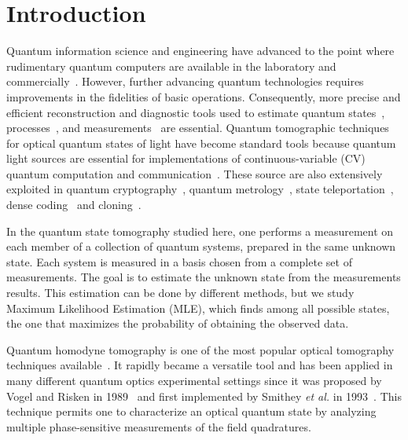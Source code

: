 \documentclass[
reprint,
superscriptaddress,
showpacs,
amsmath,
amssymb,
aps,
pra,
longbibliography
]{revtex4-1}
\begin{document}

\section{Introduction}
\label{intro}
Quantum information science and engineering have advanced to the point
where rudimentary quantum computers are available in the laboratory
and commercially~\cite{kandala2017, Linke2017, Monk2017, Denchev2016}.
However, further advancing quantum technologies requires improvements
in the fidelities of basic operations.  Consequently, more precise and
efficient reconstruction and diagnostic tools used to estimate quantum
states~\cite{Vogel1989, Smithey1993, Dunn1995, Banaszek1999,
  Banaszek2000, White2002, Ourjoumtsev2007, Neergaard2006},
processes~\cite{Chuang1997, Poyatos1997, Altepeter2003, Dariano1998,
  Nielsen1998, Mitchell2003, Obrien2004,Kupchak2015}, and
measurements~\cite{Luis1999, Fiurasek2001, Dariano2004, Lundeen2009}
are essential. Quantum tomographic techniques for optical quantum
states of light have become standard tools because quantum light
sources are essential for implementations of continuous-variable (CV)
quantum computation and communication~\cite{Lloyd1999, Gottesman2001,
  Bartlett2002, Jeong2002, Ralph2003}.  These source are also
extensively exploited in quantum cryptography~\cite{Ralph1999,
  Hillery2000, Silberhorn2002, Pirandola2008, Luiz2017}, quantum
metrology~\cite{Eberle2010, Demkowicz2013}, state
teleportation~\cite{Vaidman1994, Braunstein1998, He2015}, dense
coding~\cite{Braunstein2000, Lee2014} and cloning~\cite{Cerf2000,
  Braunstein2001}.

In the quantum state tomography studied here, one performs a
measurement on each member of a collection of quantum systems,
prepared in the same unknown state. Each system is measured in a basis
chosen from a complete set of measurements. The goal is to estimate
the unknown state from the measurements results.  This estimation can
be done by different methods, but we study Maximum Likelihood
Estimation (MLE), which finds among all possible states, the one that
maximizes the probability of obtaining the observed data.

Quantum homodyne tomography is one of the most popular optical
tomography techniques available~\cite{Lvovsky2004}. It rapidly became
a versatile tool and has been applied in many different quantum optics
experimental settings since it was proposed by Vogel and Risken in
1989~\cite{Vogel1989} and first implemented by Smithey \textit{et al.}
in 1993~\cite{Smithey1993}. This technique permits one to characterize
an optical quantum state by analyzing multiple phase-sensitive
measurements of the field quadratures.
\end{document}
